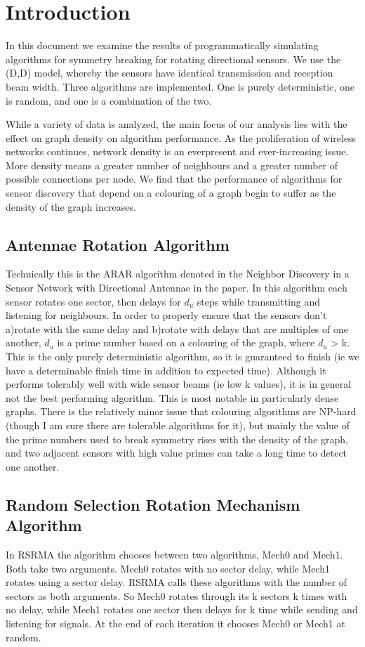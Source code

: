 \section{Introduction}
In this document we examine the results of programmatically simulating algorithms for symmetry breaking for rotating directional sensors. We use the (D,D) model, whereby the sensors have identical transmission and reception beam width. Three algorithms are implemented. One is purely deterministic, one is random, and one is a combination of the two. 

While a variety of data is analyzed, the main focus of our analysis lies with the effect on graph density on algorithm performance. As the proliferation of wireless networks continues, network density is an everpresent and ever-increasing issue. More density means a greater number of neighbours and a greater number of possible connections per node. We find that the performance of algorithms for sensor discovery that depend on a colouring of a graph begin to suffer as the density of the graph increases. 

\subsection{Antennae Rotation Algorithm}
Technically this is the ARAR algorithm denoted in the Neighbor Discovery in a Sensor Network with Directional Antennae in the paper.
In this algorithm each sensor rotates one sector, then delays for $d_{u}$ steps while transmitting and listening for neighbours. In order to properly ensure that the sensors don't a)rotate with the same delay and b)rotate with delays that are multiples of one another, $d_{u}$ is a prime number based on a colouring of the graph, where  $d_{u}$ > k. This is the only purely deterministic algorithm, so it is guaranteed to finish (ie we have a determinable finish time in addition to expected time). Although it performs tolerably well with wide sensor beams (ie low k values), it is in general not the best performing algorithm. This is most notable in particularly dense graphs. There is the relatively minor issue that colouring algorithms are NP-hard (though I am sure there are tolerable algorithms for it), but mainly the value of the prime numbers used to break symmetry rises with the density of the graph, and two adjacent sensors with high value primes can take a long time to detect one another. 

\subsection{Random Selection Rotation Mechanism Algorithm}
In RSRMA the algorithm chooses between two algorithms, Mech0 and Mech1. Both take two arguments. Mech0 rotates with no sector delay, while Mech1 rotates using a sector delay. RSRMA calls these algorithms with the number of sectors as both arguments. So Mech0 rotates through its k sectors k times with no delay, while Mech1 rotates one sector then delays for k time while sending and listening for signals. At the end of each iteration it chooses Mech0 or Mech1 at random.

